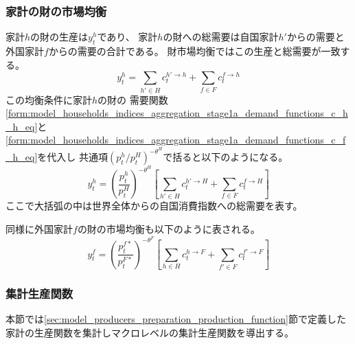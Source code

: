 \subsubsection{家計の財の市場均衡}
\label{sec:model_producers_preparation_good_market}
家計\(h\)の財の生産は\(y_t^h\)であり、
家計\(h\)の財への総需要は自国家計\(h'\)からの需要と外国家計\(f\)からの需要の合計である。
財市場均衡ではこの生産と総需要が一致する。
\begin{equation}
\label{form:model_producers_preparation_good_market_y_h_eq}
    y_t^h=\sum_{h'\in H}c_t^{h'\to h}+\sum_{f\in F}c_t^{f\to h}
\end{equation}
この均衡条件に家計\(h\)の財の
需要関数
\eqref{form:model_households_indices_aggregation_stage1a_demand_functions_c_h_h_eq}と
\eqref{form:model_households_indices_aggregation_stage1a_demand_functions_c_f_h_eq}を代入し
共通項\((p_t^h/p_t^H)^{-\theta^H}\)で括ると以下のようになる。
\begin{equation}
\label{form:model_producers_preparation_good_market_y_h_modified_eq}
    y_t^h=\left(\frac{p_t^h}{p_t^H}\right)^{-\theta^H}\left[\sum_{h'\in H}c_t^{h'\to H}+\sum_{f\in F}c_t^{f\to H}\right]
\end{equation}
ここで大括弧の中は世界全体からの自国消費指数への総需要を表す。

同様に外国家計\(f\)の財の市場均衡も以下のように表される。
\begin{equation}
\label{form:model_producers_preparation_good_market_y_f_modified_eq}
    y_t^f=\left(\frac{p_t^{f*}}{p_t^{F*}}\right)^{-\theta^F}\left[\sum_{h\in H}c_t^{h\to F}+\sum_{f'\in F}c_t^{f'\to F}\right]
\end{equation}

\subsubsection{集計生産関数}
\label{sec:model_producers_preparation_aggregated_production_function}
本節では\ref{sec:model_producers_preparation_production_function}節で定義した
家計の生産関数を集計しマクロレベルの集計生産関数を導出する。

